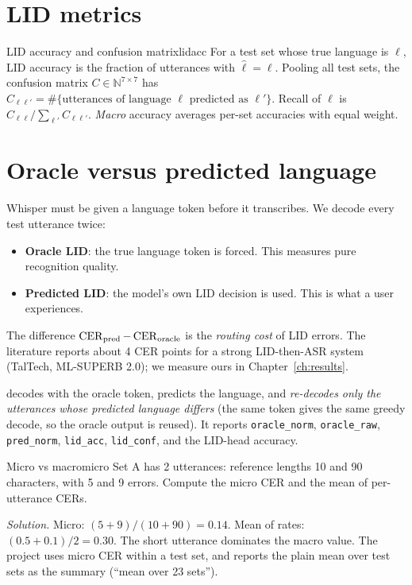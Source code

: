 \section{LID metrics}

\begin{definition}{LID accuracy and confusion matrix}{lidacc}
For a test set whose true language is $\ell$, LID accuracy is the fraction of utterances with $\hat\ell=\ell$. Pooling all test sets,
the confusion matrix $C\in\mathbb N^{7\times7}$ has $C_{\ell\ell'}=\#\{\text{utterances of language }\ell\text{ predicted as }\ell'\}$.
Recall of $\ell$ is $C_{\ell\ell}/\sum_{\ell'}C_{\ell\ell'}$. \emph{Macro} accuracy averages per-set accuracies with equal weight.
\end{definition}

\section{Oracle versus predicted language}
\label{sec:oracle}

Whisper must be given a language token before it transcribes. We decode every test utterance twice:
\begin{itemize}
\item \textbf{Oracle LID}: the true language token is forced. This measures pure recognition quality.
\item \textbf{Predicted LID}: the model's own LID decision is used. This is what a user experiences.
\end{itemize}
The difference $\operatorname{CER}_{\text{pred}}-\operatorname{CER}_{\text{oracle}}$ is the \emph{routing cost} of LID errors. The literature reports about
4 CER points for a strong LID-then-ASR system (TalTech, ML-SUPERB 2.0); we measure ours in Chapter~\ref{ch:results}.

\begin{incode}
 decodes with the oracle token, predicts the language, and \emph{re-decodes only the utterances whose
predicted language differs} (the same token gives the same greedy decode, so the oracle output is reused). It reports
\texttt{oracle\_norm}, \texttt{oracle\_raw}, \texttt{pred\_norm}, \texttt{lid\_acc}, \texttt{lid\_conf}, and the LID-head accuracy.
\end{incode}

\begin{exercise}{Micro vs macro}{micro}
Set A has 2 utterances: reference lengths 10 and 90 characters, with 5 and 9 errors. Compute the micro CER and the mean of per-utterance CERs.\par
\textit{Solution.} Micro: $(5+9)/(10+90)=0.14$. Mean of rates: $(0.5+0.1)/2=0.30$. The short utterance dominates the macro value.
The project uses micro CER within a test set, and reports the plain mean over test sets as the summary (``mean over 23 sets'').
\end{exercise}
